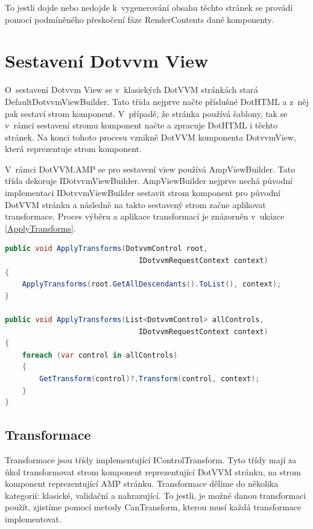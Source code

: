  To jestli dojde nebo nedojde k~vygenerování obsahu těchto stránek se provádí pomocí podmíněného přeskočení fáze RenderContents dané komponenty.
 
\section{Sestavení Dotvvm View}
O~sestavení Dotvvm View se v~klasických DotVVM stránkách stará DefaultDotvvmViewBuilder. Tato třída nejprve načte příslušné DotHTML a z~něj pak sestaví strom komponent. V~případě, že stránka používá šablony, tak se v~rámci sestavení stromu komponent načte a zpracuje DotHTML i těchto stránek. Na konci tohoto procesu vznikně DotVVM komponenta  DotvvmView, která reprezentuje strom komponent.

V~rámci DotVVM.AMP se pro sestavení view používá AmpViewBuilder. Tato třída dekoruje IDotvvmViewBuilder. AmpViewBuilder nejprve nechá původní implementaci IDotvvmViewBuilder sestavit strom komponent pro původní DotVVM stránku a následně na takto sestavený strom začne aplikovat transformace. Proces výběru a aplikace transformací je znázorněn v~ukázce \ref{ApplyTransforms}. 
\begin{lstlisting}[language=c#, caption= Ukázka aplikace transformací ,label=ApplyTransforms,captionpos=t]
public void ApplyTransforms(DotvvmControl root,
                               IDotvvmRequestContext context)
{
    ApplyTransforms(root.GetAllDescendants().ToList(), context);
}

public void ApplyTransforms(List<DotvvmControl> allControls,
                               IDotvvmRequestContext context)
{
    foreach (var control in allControls)
    {
        GetTransform(control)?.Transform(control, context);
    }
}
\end{lstlisting}
\subsection*{Transformace}
Transformace jsou třídy implementující IControlTransform. Tyto třídy mají za úkol transformovat strom komponent reprezentující DotVVM stránku, na strom komponent reprezentující AMP stránku. Transformace dělíme do několika kategorií: klasické, validační a nahrazující. To jestli, je možné danou transformaci použít, zjistíme pomocí metody CanTransform, kterou musí každá transformace implementovat.
